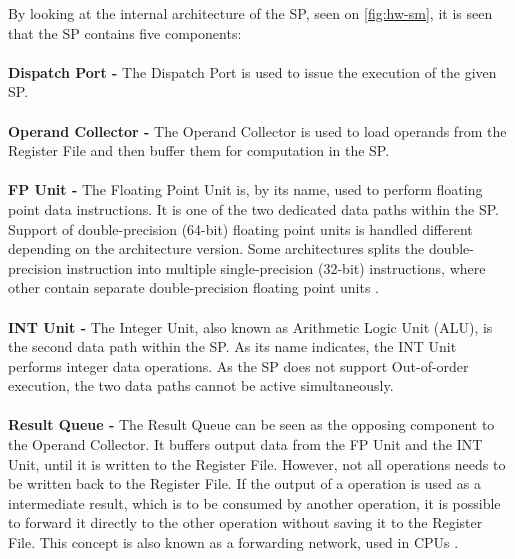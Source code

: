 By looking at the internal architecture of the SP, seen on \cref{fig:hw-sm}, it is seen that the SP contains five components:
\\\\
\textbf{Dispatch Port -} The Dispatch Port is used to issue the execution of the given SP.
\\\\
\textbf{Operand Collector -} The Operand Collector is used to load operands from the Register File and then buffer them for computation in the SP.
\\\\	
\textbf{FP Unit -} The Floating Point Unit is, by its name, used to perform floating point data instructions.
It is one of the two dedicated data paths within the SP.
Support of double-precision (64-bit) floating point units is handled different depending on the architecture version.
Some architectures splits the double-precision instruction into multiple single-precision (32-bit) instructions, where other contain separate double-precision floating point units \cite{Johansson2010}.
\\\\	
\textbf{INT Unit -} The Integer Unit, also known as Arithmetic Logic Unit (ALU), is the second data path within the SP. 
As its name indicates, the INT Unit performs integer data operations.
As the SP does not support Out-of-order execution, the two data paths cannot be active simultaneously.
\\\\	
\textbf{Result Queue -} The Result Queue can be seen as the opposing component to the Operand Collector.
It buffers output data from the FP Unit and the INT Unit, until it is written to the Register File.
However, not all operations needs to be written back to the Register File.
If the output of a operation is used as a intermediate result, which is to be consumed by another operation, it is possible to forward it directly to the other operation without saving it to the Register File.
This concept is also known as a forwarding network, used in CPUs \cite{Kanter2009}.
